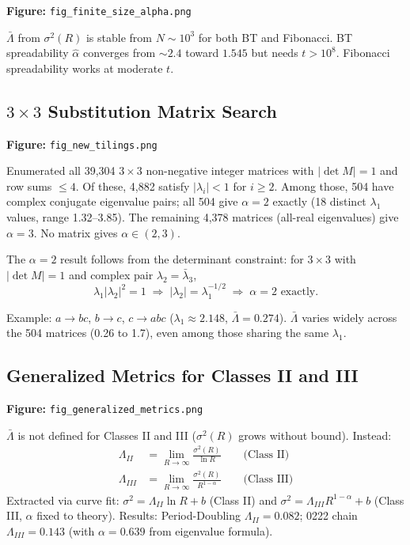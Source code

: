 \documentclass[11pt,letterpaper]{article}
\begin{document}
\textbf{Figure:} \texttt{fig\_finite\_size\_alpha.png}

$\bar\Lambda$ from $\sigma^2(R)$ is stable from $N \sim 10^3$ for both BT and Fibonacci.
BT spreadability $\hat\alpha$ converges from ${\sim}2.4$ toward $1.545$ but needs $t > 10^8$.
Fibonacci spreadability works at moderate $t$.

\subsection{$3\times3$ Substitution Matrix Search}

\textbf{Figure:} \texttt{fig\_new\_tilings.png}

Enumerated all 39,304 $3\times3$ non-negative integer matrices with $|\det M| = 1$
and row sums $\leq 4$. Of these, 4,882 satisfy $|\lambda_i| < 1$ for $i \geq 2$.
Among those, 504 have complex conjugate eigenvalue pairs; all 504 give $\alpha = 2$
exactly (18 distinct $\lambda_1$ values, range 1.32--3.85). The remaining 4,378 matrices
(all-real eigenvalues) give $\alpha = 3$. No matrix gives $\alpha \in (2,3)$.

The $\alpha = 2$ result follows from the determinant constraint: for $3\times3$ with
$|\det M| = 1$ and complex pair $\lambda_2 = \bar\lambda_3$,
\[
  \lambda_1|\lambda_2|^2 = 1 \;\Rightarrow\;
  |\lambda_2| = \lambda_1^{-1/2} \;\Rightarrow\; \alpha = 2 \text{ exactly.}
\]

Example: $a \to bc$, $b \to c$, $c \to abc$ ($\lambda_1 \approx 2.148$, $\bar\Lambda = 0.274$).
$\bar\Lambda$ varies widely across the 504 matrices (0.26 to 1.7), even among those
sharing the same $\lambda_1$.

\subsection{Generalized Metrics for Classes II and III}

\textbf{Figure:} \texttt{fig\_generalized\_metrics.png}

$\bar\Lambda$ is not defined for Classes II and III ($\sigma^2(R)$ grows without bound).
Instead:
\begin{align*}
  \Lambda_{II}   &= \lim_{R\to\infty} \frac{\sigma^2(R)}{\ln R} \qquad \text{(Class II)} \\
  \Lambda_{III}  &= \lim_{R\to\infty} \frac{\sigma^2(R)}{R^{1-\alpha}} \qquad \text{(Class III)}
\end{align*}
Extracted via curve fit: $\sigma^2 = \Lambda_{II}\ln R + b$ (Class II) and
$\sigma^2 = \Lambda_{III} R^{1-\alpha} + b$ (Class III, $\alpha$ fixed to theory).
Results: Period-Doubling $\Lambda_{II} = 0.082$;
0222 chain $\Lambda_{III} = 0.143$ (with $\alpha = 0.639$ from eigenvalue formula).
\end{document}

